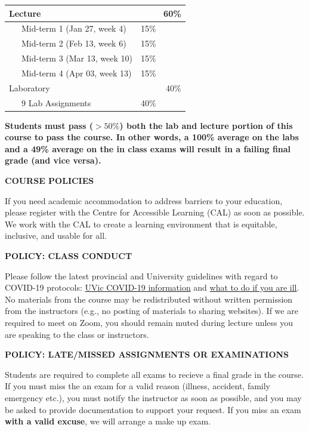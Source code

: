 \documentclass[11pt]{article}
\begin{document}
\begin{center}
		\begin{tabular}{ lr }
			Lecture                     & 60\%       \\
			\hline
			~~~Mid-term 1 (Jan 27, week 4)  & 15\%~~~~~~ \\
			~~~Mid-term 2 (Feb 13, week 6)  & 15\%~~~~~~ \\
			~~~Mid-term 3 (Mar 13, week 10) & 15\%~~~~~~ \\
			~~~Mid-term 4 (Apr 03, week 13) & 15\%~~~~~~ \\
			Laboratory                  & 40\%       \\
			\hline
			~~~9 Lab Assignments    & 40\%~~~~~~  \\
		\end{tabular}
\end{center}

\textbf{Students must pass ($>50\%$) both the lab and lecture portion of this course to pass the course. In other words, a 100\% average on the labs and a 49\% average on the in class exams will result in a failing final grade (and vice versa).}

\begin{center}
  \textbf{COURSE POLICIES}
\end{center}

If you need academic accommodation to address barriers to your education, please register with the Centre for Accessible Learning (CAL) as soon as possible. We work with the CAL to create a learning environment that is equitable, inclusive, and usable for all.

\textbf{POLICY: CLASS CONDUCT}

Please follow the latest provincial and University guidelines with regard to COVID-19 protocols: \href{https://www.uvic.ca/covid19/index.php}{UVic COVID-19 information} and \href{https://www.uvic.ca/covid19/health-safety/index.php#ipn-if-you-re-sick}{what to do if you are ill}. No materials from the course may be redistributed without written permission from the instructors (e.g., no posting of materials to sharing websites). If we are required to meet on Zoom, you should remain muted during lecture unless you are speaking to the class or instructors.

\textbf{POLICY: LATE/MISSED ASSIGNMENTS OR EXAMINATIONS}

Students are required to complete all exams to recieve a final grade in the course. If you must miss the an exam for a valid reason (illness, accident, family emergency etc.), you must notify the instructor as soon as possible, and you may be asked to provide documentation to support your request. If you miss an exam \textbf{with a valid excuse}, we will arrange a make up exam.
\end{document}
